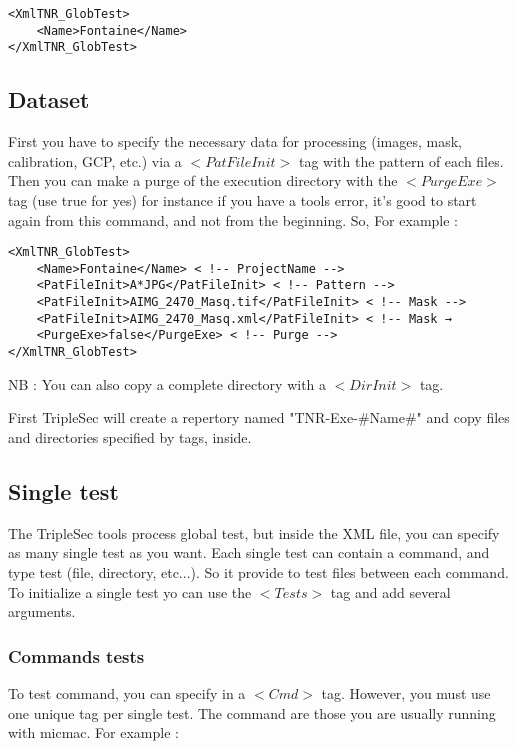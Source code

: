 \documentclass[a4paper]{book}
\begin{document}
\begin{lstlisting}
<XmlTNR_GlobTest>
	<Name>Fontaine</Name>
</XmlTNR_GlobTest>
\end{lstlisting}

\subsection{Dataset}
First you have to specify the necessary data for processing (images, mask, calibration, GCP, etc.) via a $<PatFileInit>$ tag with the pattern of each files. Then you can make a purge of the execution directory with the $<PurgeExe>$ tag (use true for yes) for instance if you have a tools error, it's good to start again from this command, and not from the beginning. So, For example :

\begin{lstlisting}
<XmlTNR_GlobTest>
	<Name>Fontaine</Name> < !-- ProjectName -->
	<PatFileInit>A*JPG</PatFileInit> < !-- Pattern -->
	<PatFileInit>AIMG_2470_Masq.tif</PatFileInit> < !-- Mask -->
	<PatFileInit>AIMG_2470_Masq.xml</PatFileInit> < !-- Mask →
	<PurgeExe>false</PurgeExe> < !-- Purge -->
</XmlTNR_GlobTest>
\end{lstlisting}

NB : You can also copy a complete directory with a $<DirInit>$ tag.

First TripleSec will create a repertory named "TNR-Exe-\#Name\#" and copy files and directories specified by tags, inside.

\subsection{Single test}
The TripleSec tools process global test, but inside the XML file, you can specify as many single test as you want. Each single test can contain a command, and type test (file, directory, etc...). So it provide to test files between each command. To initialize a single test yo can use the $<Tests>$ tag and add several arguments.

\subsubsection{Commands tests}
To test command, you can specify in a $<Cmd>$ tag. However, you must use one unique tag per single test. The command are those you are usually running with micmac. For example :
\end{document}
